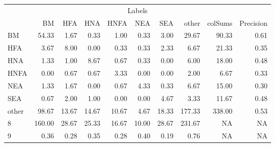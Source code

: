 \begin{table}
\centering\begingroup\fontsize{11}{13}\selectfont

\begin{tabular}{lrrrrrr>{}r|rr}
\toprule
\multicolumn{10}{c}{Labels} \\
\cmidrule(l{3pt}r{3pt}){1-10}
  & BM & HFA & HNA & HNFA & NEA & SEA & other & colSums & Precision\\
\midrule
BM & 54.33 & 1.67 & 0.33 & 1.00 & 0.33 & 3.00 & 29.67 & 90.33 & 0.61\\
HFA & 3.67 & 8.00 & 0.00 & 0.33 & 0.33 & 2.33 & 6.67 & 21.33 & 0.35\\
HNA & 1.33 & 1.00 & 8.67 & 0.67 & 0.33 & 0.00 & 6.00 & 18.00 & 0.48\\
HNFA & 0.00 & 0.67 & 0.67 & 3.33 & 0.00 & 0.00 & 2.00 & 6.67 & 0.33\\
NEA & 1.33 & 1.67 & 0.00 & 0.67 & 4.33 & 0.33 & 6.67 & 15.00 & 0.30\\
\addlinespace
SEA & 0.67 & 2.00 & 1.00 & 0.00 & 0.00 & 4.67 & 3.33 & 11.67 & 0.48\\
other & 98.67 & 13.67 & 14.67 & 10.67 & 4.67 & 18.33 & 177.33 & 338.00 & 0.53\\
8 & 160.00 & 28.67 & 25.33 & 16.67 & 10.00 & 28.67 & 231.67 & NA & NA\\
9 & 0.36 & 0.28 & 0.35 & 0.28 & 0.40 & 0.19 & 0.76 & NA & NA\\
\bottomrule
\end{tabular}
\endgroup{}
\end{table}
